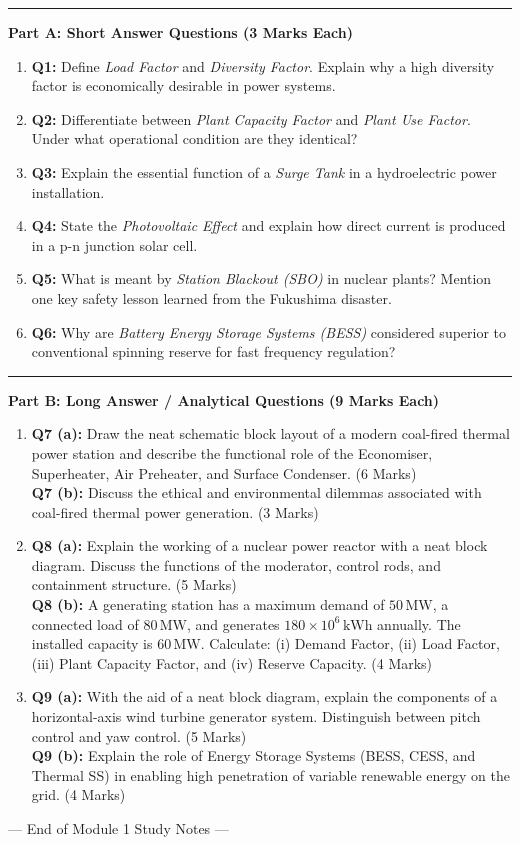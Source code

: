 \documentclass[11pt,a4paper]{article}
\newcommand{\concept}[1]{%
  \vspace{3pt}\noindent\textcolor{AnthGreen}{\rule{3.5pt}{10pt}}\enspace
  \textbf{\sffamily\color{AnthDark}#1}\par\vspace{2pt}%
}
\begin{document}
\concept{Part A: Short Answer Questions (3 Marks Each)}
\begin{enumerate}
  \item \textbf{Q1:} Define \emph{Load Factor} and \emph{Diversity Factor}. Explain why a high diversity factor is economically desirable in power systems.
  \item \textbf{Q2:} Differentiate between \emph{Plant Capacity Factor} and \emph{Plant Use Factor}. Under what operational condition are they identical?
  \item \textbf{Q3:} Explain the essential function of a \emph{Surge Tank} in a hydroelectric power installation.
  \item \textbf{Q4:} State the \emph{Photovoltaic Effect} and explain how direct current is produced in a p-n junction solar cell.
  \item \textbf{Q5:} What is meant by \emph{Station Blackout (SBO)} in nuclear plants? Mention one key safety lesson learned from the Fukushima disaster.
  \item \textbf{Q6:} Why are \emph{Battery Energy Storage Systems (BESS)} considered superior to conventional spinning reserve for fast frequency regulation?
\end{enumerate}

\concept{Part B: Long Answer / Analytical Questions (9 Marks Each)}
\begin{enumerate}
  \item \textbf{Q7 (a):} Draw the neat schematic block layout of a modern coal-fired thermal power station and describe the functional role of the Economiser, Superheater, Air Preheater, and Surface Condenser. \hfill (6 Marks) \\
  \textbf{Q7 (b):} Discuss the ethical and environmental dilemmas associated with coal-fired thermal power generation. \hfill (3 Marks)
  
  \item \textbf{Q8 (a):} Explain the working of a nuclear power reactor with a neat block diagram. Discuss the functions of the moderator, control rods, and containment structure. \hfill (5 Marks) \\
  \textbf{Q8 (b):} A generating station has a maximum demand of $50\,\text{MW}$, a connected load of $80\,\text{MW}$, and generates $180 \times 10^6\,\text{kWh}$ annually. The installed capacity is $60\,\text{MW}$. Calculate: (i) Demand Factor, (ii) Load Factor, (iii) Plant Capacity Factor, and (iv) Reserve Capacity. \hfill (4 Marks)

  \item \textbf{Q9 (a):} With the aid of a neat block diagram, explain the components of a horizontal-axis wind turbine generator system. Distinguish between pitch control and yaw control. \hfill (5 Marks) \\
  \textbf{Q9 (b):} Explain the role of Energy Storage Systems (BESS, CESS, and Thermal SS) in enabling high penetration of variable renewable energy on the grid. \hfill (4 Marks)
\end{enumerate}

\vfill
\begin{center}
\small\sffamily\color{AnthMidGray}
--- End of Module 1 Study Notes ---
\end{center}
\end{document}

